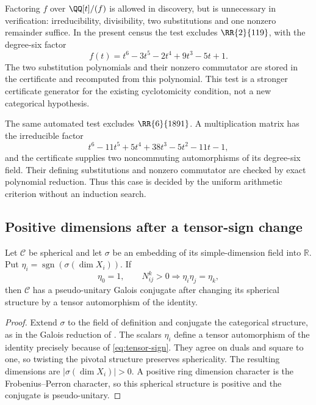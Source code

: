 Factoring $f$ over $\QQ[t]/(f)$ is allowed in discovery, but is unnecessary
in verification: irreducibility, divisibility, two substitutions and one
nonzero remainder suffice. In the present census the test excludes
$\RR{2}{119}$, with the degree-six factor
\[
 f(t)=t^6-3t^5-2t^4+9t^3-5t+1.
\]
The two substitution polynomials and their nonzero commutator are stored
in the certificate and recomputed from this polynomial. This test is a
stronger certificate generator for the existing cyclotomicity condition,
not a new categorical hypothesis.

The same automated test excludes $\RR{6}{1891}$. A multiplication
matrix has the irreducible factor
\[
 t^6-11t^5+5t^4+38t^3-5t^2-11t-1,
\]
and the certificate supplies two noncommuting automorphisms of its
degree-six field. Their defining substitutions and nonzero commutator
are checked by exact polynomial reduction. Thus this case is decided
by the uniform arithmetic criterion without an induction search.

\subsection{Positive dimensions after a tensor-sign change}
\begin{lemma}\label{lem:positive-sign}
Let $\mathcal C$ be spherical and let $\sigma$ be an embedding of its
simple-dimension field into $\mathbb R$. Put
$\eta_i=\operatorname{sgn}(\sigma(\dim X_i))$. If
\begin{equation}\label{eq:tensor-sign}
 \eta_0=1,\qquad N_{ij}^k>0\Longrightarrow\eta_i\eta_j=\eta_k,
\end{equation}
then $\mathcal C$ has a pseudo-unitary Galois conjugate after changing
its spherical structure by a tensor automorphism of the identity.
\end{lemma}
\begin{proof}
Extend $\sigma$ to the field of definition and conjugate the categorical
structure, as in the Galois reduction of \cite{DP4}. The scalars $\eta_i$
define a tensor automorphism of the identity precisely because of
\eqref{eq:tensor-sign}. They agree on duals and square to one, so twisting
the pivotal structure preserves sphericality. The resulting dimensions
are $|\sigma(\dim X_i)|>0$. A positive ring dimension character is the
Frobenius--Perron character, so this spherical structure is positive and
the conjugate is pseudo-unitary.
\end{proof}

